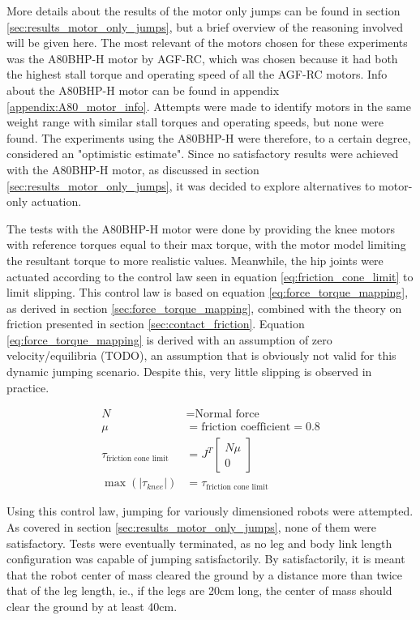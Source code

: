 More details about the results of the motor only jumps can be found in section \ref{sec:results_motor_only_jumps}, but a brief overview of the reasoning involved will be given here. The most relevant of the motors chosen for these experiments was the A80BHP-H motor by AGF-RC, which was chosen because it had both the highest stall torque and operating speed of all the AGF-RC motors. Info about the A80BHP-H motor can be found in appendix \ref{appendix:A80_motor_info}. Attempts were made to identify motors in the same weight range with similar stall torques and operating speeds, but none were found. The experiments using the A80BHP-H were therefore, to a certain degree, considered an "optimistic estimate". Since no satisfactory results were achieved with the A80BHP-H motor, as discussed in section \ref{sec:results_motor_only_jumps}, it was decided to explore alternatives to motor-only actuation. 

The tests with the A80BHP-H motor were done by providing the knee motors with reference torques equal to their max torque, with the motor model limiting the resultant torque to more realistic values. Meanwhile, the hip joints were actuated according to the control law seen in equation \ref{eq:friction_cone_limit} to limit slipping. This control law is based on equation \ref{eq:force_torque_mapping}, as derived in section \ref{sec:force_torque_mapping}, combined with the theory on friction presented in section \ref{sec:contact_friction}. Equation \ref{eq:force_torque_mapping} is derived with an assumption of zero velocity/equilibria (TODO), an assumption that is obviously not valid for this dynamic jumping scenario. Despite this, very little slipping is observed in practice.   

\begin{align}
    N &= \text{Normal force} \\
    \mu &= \text{friction coefficient} = 0.8 \\
    \tau_{\text{friction cone limit}} &= J^T 
    \begin{bmatrix}
        N \mu \\
        0
    \end{bmatrix} \\
    \max(|\tau_{knee}|) &= \tau_{\text{friction cone limit}}
    \label{eq:friction_cone_limit}
\end{align}

Using this control law, jumping for variously dimensioned robots were attempted. As covered in section \ref{sec:results_motor_only_jumps}, none of them were satisfactory. Tests were eventually terminated, as no leg and body link length configuration was capable of jumping satisfactorily. By satisfactorily, it is meant that the robot center of mass cleared the ground by a distance more than twice that of the leg length, ie., if the legs are 20cm long, the center of mass should clear the ground by at least 40cm. 

